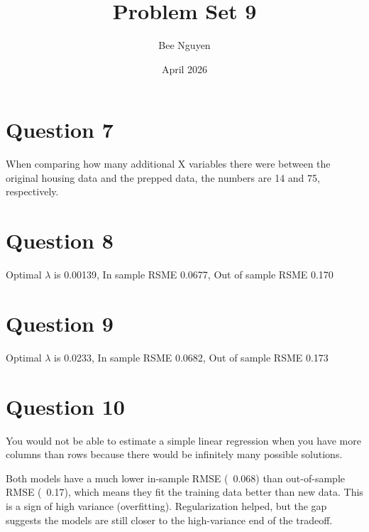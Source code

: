 \documentclass{article}
\title{Problem Set 9}
\author{Bee Nguyen}
\date{April 2026}
\begin{document}
\maketitle

\section{Question 7}
When comparing how many additional X variables there were between the original housing data and the prepped data, the numbers are 14 and 75, respectively. 

\section{Question 8}

Optimal $\lambda$ is 0.00139, In sample RSME 0.0677, Out of sample RSME 0.170

\section{Question 9}

Optimal $\lambda$  is 0.0233, In sample RSME 0.0682, Out of sample RSME 0.173

\section{Question 10}

You would not be able to estimate a simple linear regression when you have more columns than rows because there would be infinitely many possible solutions. 

Both models have a much lower in-sample RMSE (~0.068) than out-of-sample RMSE 
(~0.17), which means they fit the training data better than new data. This is 
a sign of high variance (overfitting). Regularization helped, but the gap 
suggests the models are still closer to the high-variance end of the tradeoff.
\end{document}

